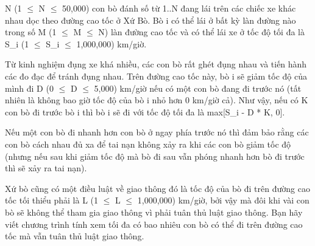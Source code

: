 N (1  $\le$  N  $\le$  50,000) con bò đánh số từ 1..N đang lái trên các  chiếc xe khác nhau dọc theo đường cao tốc ở Xứ Bò. Bò i có thể  lái ở bất kỳ làn đường nào trong số M (1  $\le$  M  $\le$  N) làn đường cao  tốc và có thể lái xe ở tốc độ tối đa là S\_i (1  $\le$  S\_i  $\le$  1,000,000) km/giờ.  

   Từ kinh nghiệm đụng xe khá nhiều, các con bò rất ghét đụng nhau  và tiến hành các đo đạc để tránh đụng nhau. Trên đường cao tốc này, bò  i sẽ giảm tốc độ của mình đi D (0 $\le$  D  $\le$  5,000) km/giờ nếu có  một con bò đang đi trước nó (tất nhiên là không bao giờ tốc độ của  bò i nhỏ hơn 0 km/giờ cả). Như vậy, nếu có K con bò đi trước bò i  thì bò i sẽ đi với tốc độ tối đa là max[S\_i - D * K, 0].  

   Nếu một  con bò đi nhanh hơn con bò ở ngay phía trước nó thì đảm bảo  rằng các con bò cách nhau đủ xa để tai nạn không xảy ra khi các con  bò giảm tốc độ (nhưng nếu sau khi giảm tốc độ mà bò đi sau vẫn  phóng nhanh hơn bò đi trước thì sẽ xảy ra tai nạn).  

   Xứ bò cũng có một điều luật về giao thông đó là tốc độ của bò  đi trên đường cao tốc tối thiểu phải là L (1  $\le$  L  $\le$  1,000,000) km/giờ, bởi  vậy mà đôi khi vài con bò sẽ không thể tham gia giao thông vì  phải tuân thủ luật giao thông. Bạn hãy viết chương trình  tính xem tối đa có bao nhiêu con bò có thể đi trên đường cao tốc mà vẫn  tuân thủ luật giao thông.